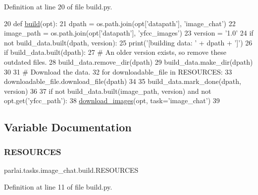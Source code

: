 Definition at line 20 of file build.\+py.


\begin{DoxyCode}
20 \textcolor{keyword}{def }\hyperlink{namespacedialog__babi__feedback_1_1build_a7a9d289f7493a5ded13c4b7f071b6184}{build}(opt):
21     dpath = os.path.join(opt[\textcolor{stringliteral}{'datapath'}], \textcolor{stringliteral}{'image\_chat'})
22     image\_path = os.path.join(opt[\textcolor{stringliteral}{'datapath'}], \textcolor{stringliteral}{'yfcc\_images'})
23     version = \textcolor{stringliteral}{'1.0'}
24     \textcolor{keywordflow}{if} \textcolor{keywordflow}{not} build\_data.built(dpath, version):
25         print(\textcolor{stringliteral}{'[building data: '} + dpath + \textcolor{stringliteral}{']'})
26         \textcolor{keywordflow}{if} build\_data.built(dpath):
27             \textcolor{comment}{# An older version exists, so remove these outdated files.}
28             build\_data.remove\_dir(dpath)
29         build\_data.make\_dir(dpath)
30 
31         \textcolor{comment}{# Download the data.}
32         \textcolor{keywordflow}{for} downloadable\_file \textcolor{keywordflow}{in} RESOURCES:
33             downloadable\_file.download\_file(dpath)
34 
35         build\_data.mark\_done(dpath, version)
36 
37     \textcolor{keywordflow}{if} \textcolor{keywordflow}{not} build\_data.built(image\_path, version) \textcolor{keywordflow}{and} \textcolor{keywordflow}{not} opt.get(\textcolor{stringliteral}{'yfcc\_path'}):
38         \hyperlink{namespaceparlai_1_1tasks_1_1personality__captions_1_1download__images_a9d812a095ca6d48541b3d5cdc65a4bf3}{download\_images}(opt, task=\textcolor{stringliteral}{'image\_chat'})
39 \end{DoxyCode}


\subsection{Variable Documentation}
\mbox{\label{namespaceparlai_1_1tasks_1_1image__chat_1_1build_af499ab24779be231673b33acace2a11f}} 
\subsubsection{\texorpdfstring{R\+E\+S\+O\+U\+R\+C\+ES}{RESOURCES}}
{\footnotesize\ttfamily parlai.\+tasks.\+image\+\_\+chat.\+build.\+R\+E\+S\+O\+U\+R\+C\+ES}



Definition at line 11 of file build.\+py.

